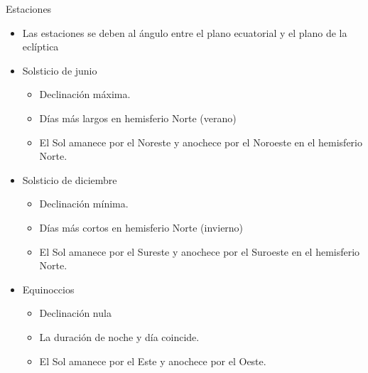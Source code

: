 \documentclass[xcolor={usenames,svgnames,dvipsnames}]{beamer}
\begin{document}
\begin{frame}[label={sec:org767f454}]{Estaciones}
\begin{itemize}[<+->]
\item Las estaciones se deben al ángulo entre el plano ecuatorial y el plano de
la eclíptica

\item \alert{Solsticio de junio}
\begin{itemize}[<.->]
\item Declinación máxima.

\item Días más largos en hemisferio Norte (verano)

\item El Sol amanece por el Noreste y anochece por el Noroeste en el
hemisferio Norte.
\end{itemize}

\item \alert{Solsticio de diciembre}
\begin{itemize}[<.->]
\item Declinación mínima.

\item Días más cortos en hemisferio Norte (invierno)

\item El Sol amanece por el Sureste y anochece por el Suroeste en el
hemisferio Norte.
\end{itemize}

\item \alert{Equinoccios}
\begin{itemize}[<.->]
\item Declinación nula

\item La duración de noche y día coincide.

\item El Sol amanece por el Este y anochece por el Oeste.
\end{itemize}
\end{itemize}
\end{frame}
\end{document}
